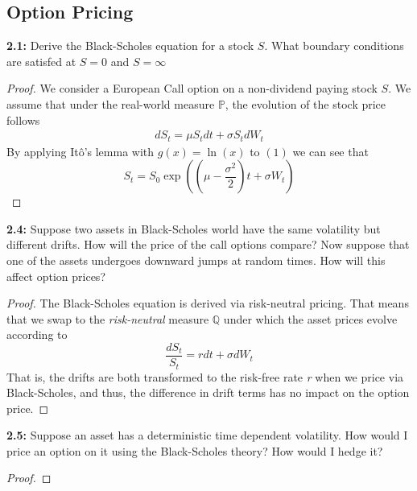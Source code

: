 \subsection*{Option Pricing}

\begin{tcolorbox}[colframe=black,colback=gray!5,boxrule=0.5pt]
\textbf{2.1:} Derive the Black-Scholes equation for a stock $S$. What boundary conditions are satisfed at $S=0$ and $S=\infty$ 
\end{tcolorbox}
\begin{proof}
    We consider a European Call option on a non-dividend paying stock $S$. We assume that under the real-world measure $\mathbb{P}$, the evolution of the stock price follows
    \begin{align*}
        dS_t = \mu S_tdt + \sigma S_tdW_t \tag{1}
    \end{align*}
    By applying Itô's lemma with $g(x) = \ln(x)$ to $(1)$ we can see that 
    $$S_t = S_0\exp\left(\left(\mu-\frac{\sigma^2}{2}\right)t+\sigma W_t\right) $$
\end{proof}


\begin{tcolorbox}[colframe=black,colback=gray!5,boxrule=0.5pt]
\textbf{2.4:} Suppose two assets in Black-Scholes world have the same volatility but different drifts. How will the price of the call options compare? Now suppose that one of the assets undergoes downward jumps at random times. How will this affect option prices? 
\end{tcolorbox}
\begin{proof}
    The Black-Scholes equation is derived via risk-neutral pricing. That means that we swap to the \textit{risk-neutral} measure $\mathbb{Q}$ under which the asset prices evolve according to 
    $$\frac{dS_t}{S_t} = rdt + \sigma dW_t$$
    That is, the drifts are both transformed to the risk-free rate \textit{r} when we price via Black-Scholes, and thus, the difference in drift terms has no impact on the option price.
\end{proof}


\begin{tcolorbox}[colframe=black,colback=gray!5,boxrule=0.5pt]
\textbf{2.5:} Suppose an asset has a deterministic time dependent volatility.
How would I price an option on it using the Black-Scholes theory? How would
I hedge it?
\end{tcolorbox}
\begin{proof}
    
\end{proof}
